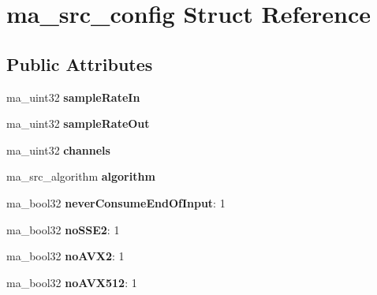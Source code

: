 \hypertarget{structma__src__config}{}\section{ma\+\_\+src\+\_\+config Struct Reference}
\label{structma__src__config}
\subsection*{Public Attributes}
\begin{DoxyCompactItemize}
\item 
\mbox{\label{structma__src__config_a77dc3f1e3a851f874bb8456adbbfa9ee}} 
ma\+\_\+uint32 {\bfseries sample\+Rate\+In}
\item 
\mbox{\label{structma__src__config_a1e6f9875b83d64c7b52f90a7032d5333}} 
ma\+\_\+uint32 {\bfseries sample\+Rate\+Out}
\item 
\mbox{\label{structma__src__config_aef7d45a000f5f241c2e6ea583127c987}} 
ma\+\_\+uint32 {\bfseries channels}
\item 
\mbox{\label{structma__src__config_af0750353e44fdeed415d6143f0407c9f}} 
ma\+\_\+src\+\_\+algorithm {\bfseries algorithm}
\item 
\mbox{\label{structma__src__config_a4f6c4cee9e3d22054aba8eada7288ea6}} 
ma\+\_\+bool32 {\bfseries never\+Consume\+End\+Of\+Input}\+: 1
\item 
\mbox{\label{structma__src__config_a9fed7333f7bf659a26c5bf1fbef85f36}} 
ma\+\_\+bool32 {\bfseries no\+S\+S\+E2}\+: 1
\item 
\mbox{\label{structma__src__config_adf12305e1ddeba7bdf860a5676f1ff63}} 
ma\+\_\+bool32 {\bfseries no\+A\+V\+X2}\+: 1
\item 
\mbox{\label{structma__src__config_a681f1b473182d85cbedb1c1b186b7048}} 
ma\+\_\+bool32 {\bfseries no\+A\+V\+X512}\+: 1
\item 
\mbox{\label{structma__src__config_acccce4ce7464216d152b916e72fb6910}} 

\end{DoxyCompactItemize}
